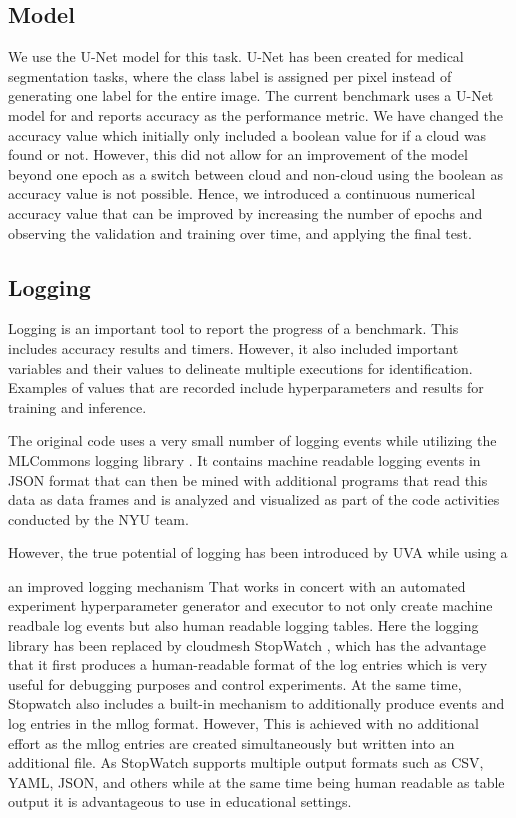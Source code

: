 \documentclass[sigplan,screen]{acmart}
\begin{document}
\subsection{Model}

We use the U-Net \cite{Ronneberger2015UNetCN} model for this task. U-Net has been created for medical segmentation tasks, where the class label is assigned per pixel instead of generating one label for the entire image.
The current benchmark uses a U-Net model for and reports accuracy as the performance metric. We have changed the accuracy value which initially only included a boolean value for if a cloud was found or not. However, this did not allow for an improvement of the model beyond one epoch as a switch between cloud and non-cloud using the boolean as accuracy value is not possible. Hence, we introduced a continuous numerical accuracy value that can be improved by increasing the number of epochs and observing the validation and training over time, and applying the final test.



\subsection{Logging}

Logging is an important tool to report the progress of a benchmark. This includes accuracy results and timers. However, it also included important variables and their values to delineate multiple executions for identification. Examples of values that are recorded include hyperparameters and results for training and inference. 

The original code uses a very small number of logging events while utilizing the MLCommons logging library
\cite{github-mlcommons-logging}. It contains machine readable logging events in JSON format that can then be mined with additional programs that read this data as data frames and is analyzed and visualized as part of the code activities conducted by the NYU team.

However, the true potential of logging has been introduced by UVA while using a 

an improved logging mechanism That works in concert with an automated experiment hyperparameter generator and executor to not only create machine readbale log events but also human readable logging tables.
Here the logging library has been replaced by cloudmesh StopWatch \cite{github-mlcommons-logging,github-cloudmesh-sbatch}, which has the advantage that it first produces a human-readable format of the log entries which is very useful for debugging purposes and control experiments. At the same time, Stopwatch also includes a built-in mechanism to additionally produce events and log entries in the mllog format. However, This is achieved with no additional effort as the mllog entries are created simultaneously but written into an additional file. As StopWatch supports multiple output formats such as CSV, YAML, JSON, and others while at the same time being human readable as table output it is advantageous to use in educational settings.
\end{document}
